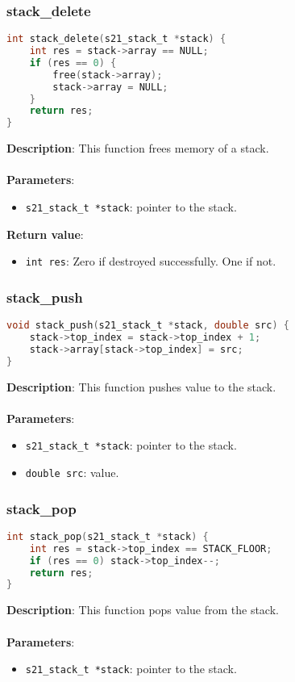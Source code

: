 \documentclass{article}
\begin{document}
\subsubsection{stack\_delete}
\begin{lstlisting}[language=C]
int stack_delete(s21_stack_t *stack) {
    int res = stack->array == NULL;
    if (res == 0) {
        free(stack->array);
        stack->array = NULL;
    }
    return res;
}
\end{lstlisting}
\noindent
\textbf{Description}: This function frees memory of a stack.\\\\
\textbf{Parameters}:
\begin{itemize}
    \item \texttt{s21\_stack\_t *stack}: pointer to the stack.
\end{itemize}
\textbf{Return value}:
\begin{itemize}
    \item \texttt{int res}: Zero if destroyed successfully. One if not.
\end{itemize}

\subsubsection{stack\_push}
\begin{lstlisting}[language=C]
void stack_push(s21_stack_t *stack, double src) {
    stack->top_index = stack->top_index + 1;
    stack->array[stack->top_index] = src;
} 
\end{lstlisting}
\noindent
\textbf{Description}: This function pushes value to the stack.\\\\
\textbf{Parameters}:
\begin{itemize}
    \item \texttt{s21\_stack\_t *stack}: pointer to the stack.
    \item \texttt{double src}: value.
\end{itemize}

\subsubsection{stack\_pop}
\begin{lstlisting}[language=C]
int stack_pop(s21_stack_t *stack) {
    int res = stack->top_index == STACK_FLOOR;
    if (res == 0) stack->top_index--;
    return res;
}
\end{lstlisting}
\noindent
\textbf{Description}: This function pops value from the stack.\\\\
\textbf{Parameters}:
\begin{itemize}
    \item \texttt{s21\_stack\_t *stack}: pointer to the stack.
\end{itemize}
\end{document}
